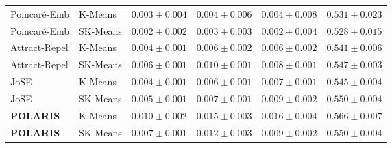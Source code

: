 \documentclass[journal]{IEEEtran}
\begin{document}
\begin{table}[!t]
{\begin{tabular}{llcccc}
Poincar\'{e}-Emb & K-Means & $0.003 \pm 0.004$ & $0.004 \pm 0.006$ & $0.004 \pm 0.008$ & $0.531 \pm 0.023$ \\
Poincar\'{e}-Emb & SK-Means & $0.002 \pm 0.002$ & $0.003 \pm 0.003$ & $0.002 \pm 0.004$ & $0.528 \pm 0.015$ \\
Attract-Repel & K-Means & $0.004 \pm 0.001$ & $0.006 \pm 0.002$ & $0.006 \pm 0.002$ & $0.541 \pm 0.006$ \\
Attract-Repel & SK-Means & $0.006 \pm 0.001$ & $0.010 \pm 0.001$ & $0.008 \pm 0.001$ & $0.547 \pm 0.003$ \\
JoSE & K-Means & $0.004 \pm 0.001$ & $0.006 \pm 0.001$ & $0.007 \pm 0.001$ & $0.545 \pm 0.004$ \\
JoSE & SK-Means & $0.005 \pm 0.001$ & $0.007 \pm 0.001$ & $0.009 \pm 0.002$ & $0.550 \pm 0.004$ \\
\textbf{POLARIS} & K-Means & $\mathbf{0.010 \pm 0.002}$ & $\mathbf{0.015 \pm 0.003}$ & $\mathbf{0.016 \pm 0.004}$ & $\mathbf{0.566 \pm 0.007}$ \\
\textbf{POLARIS} & SK-Means & $0.007 \pm 0.001$ & $0.012 \pm 0.003$ & $0.009 \pm 0.002$ & $0.550 \pm 0.004$ \\
\bottomrule
\end{tabular}%
}
\end{table}

\begin{table}[!t]
\centering
\caption{Experiment 3 (Panel C): Anchor-Guided Zero-Shot Polarity Projection Along Antipodal Axis $\mathbf{p}_{\text{bip}} \in \mathbb{S}^{99}$ on Rotten Tomatoes Held-Out Test Reviews (10 Seeds, Mean $\pm$ SD).}
\label{tab:exp3_polarity_proj}
\end{table}
\end{document}
